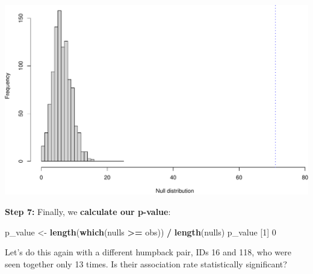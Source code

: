 \documentclass[
]{book}
\newenvironment{Shaded}{\begin{snugshade}}{\end{snugshade}}
\newcommand{\DecValTok}[1]{\textcolor[rgb]{0.00,0.00,0.81}{#1}}
\newcommand{\KeywordTok}[1]{\textcolor[rgb]{0.13,0.29,0.53}{\textbf{#1}}}
\newcommand{\NormalTok}[1]{#1}
\newcommand{\OperatorTok}[1]{\textcolor[rgb]{0.81,0.36,0.00}{\textbf{#1}}}
\newcommand{\StringTok}[1]{\textcolor[rgb]{0.31,0.60,0.02}{#1}}
\begin{document}
\includegraphics{figures/unnamed-chunk-351-1.pdf}

\textbf{Step 7:} Finally, we \textbf{calculate our p-value}:

\begin{Shaded}
\begin{Highlighting}[]
\NormalTok{p_value <-}\StringTok{ }\KeywordTok{length}\NormalTok{(}\KeywordTok{which}\NormalTok{(nulls }\OperatorTok{>=}\StringTok{ }\NormalTok{obs)) }\OperatorTok{/}\StringTok{ }\KeywordTok{length}\NormalTok{(nulls)}
\NormalTok{p_value}
\NormalTok{[}\DecValTok{1}\NormalTok{] }\DecValTok{0}
\end{Highlighting}
\end{Shaded}

Let's do this again with a different humpback pair, IDs 16 and 118, who were seen together only 13 times. Is their association rate statistically significant?
\end{document}
